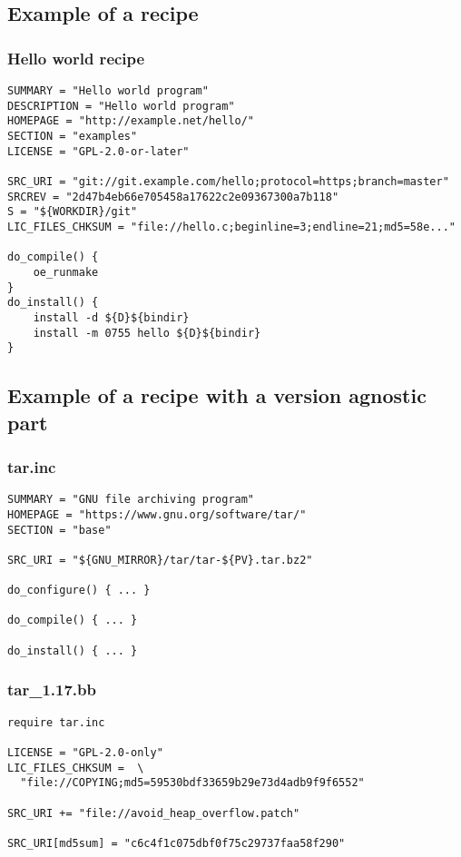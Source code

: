 \subsection{Example of a recipe}

\begin{frame}[fragile]
  \frametitle{Hello world recipe}
  \begin{block}{}
    \begin{verbatim}
SUMMARY = "Hello world program"
DESCRIPTION = "Hello world program"
HOMEPAGE = "http://example.net/hello/"
SECTION = "examples"
LICENSE = "GPL-2.0-or-later"

SRC_URI = "git://git.example.com/hello;protocol=https;branch=master"
SRCREV = "2d47b4eb66e705458a17622c2e09367300a7b118"
S = "${WORKDIR}/git"
LIC_FILES_CHKSUM = "file://hello.c;beginline=3;endline=21;md5=58e..."

do_compile() {
    oe_runmake
}
do_install() {
    install -d ${D}${bindir}
    install -m 0755 hello ${D}${bindir}
}
    \end{verbatim}
  \end{block}
\end{frame}

\subsection{Example of a recipe with a version agnostic part}

\begin{frame}[fragile]
  \frametitle{tar.inc}
  \begin{block}{}
    \begin{verbatim}
SUMMARY = "GNU file archiving program"
HOMEPAGE = "https://www.gnu.org/software/tar/"
SECTION = "base"

SRC_URI = "${GNU_MIRROR}/tar/tar-${PV}.tar.bz2"

do_configure() { ... }

do_compile() { ... }

do_install() { ... }
    \end{verbatim}
  \end{block}
\end{frame}

\begin{frame}[fragile]
  \frametitle{tar\_1.17.bb}
  \begin{block}{}
    \begin{verbatim}
require tar.inc

LICENSE = "GPL-2.0-only"
LIC_FILES_CHKSUM =  \
  "file://COPYING;md5=59530bdf33659b29e73d4adb9f9f6552"

SRC_URI += "file://avoid_heap_overflow.patch"

SRC_URI[md5sum] = "c6c4f1c075dbf0f75c29737faa58f290"
    \end{verbatim}
  \end{block}
\end{frame}

